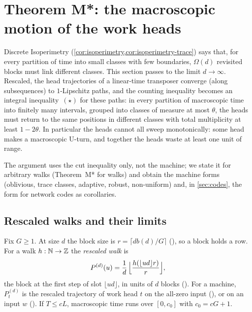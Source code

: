 \section{Theorem M*: the macroscopic motion of the work heads}\label{sec:mstar}

Discrete Isoperimetry (\cref{cor:isoperimetry,cor:isoperimetry-trace}) says that, for every
partition of time into small classes with few boundaries, $\Omega(d)$ revisited blocks must link
different classes. This section passes to the limit $d\to\infty$. Rescaled, the head trajectories of
a linear-time transposer converge (along subsequences) to $1$-Lipschitz paths, and the counting
inequality becomes an integral inequality~$(\star)$ for these paths: in every partition of macroscopic time into finitely many intervals, grouped into classes of measure at most $\theta$, the heads must return to the same
positions in different classes with total multiplicity at least $1-2\theta$. In particular the
heads cannot all sweep monotonically: some head makes a macroscopic U-turn, and together the heads
waste at least one unit of range.

The argument uses the cut inequality only, not the machine; we state it for arbitrary walks
(Theorem~M* for walks) and obtain the machine forms (oblivious, trace classes, adaptive, robust,
non-uniform) and, in \cref{sec:codes}, the form for network codes as corollaries.

\subsection{Rescaled walks and their limits}

Fix $G\ge1$. At size $d$ the block size is $r=\lceil db(d)/G\rceil$ (), so a
block holds a row. For a walk $h:\mathbb{N}\to\mathbb{Z}$ the \emph{rescaled walk} is
\[
  P^{(d)}(u)=\frac{1}{d}\,\Bigl\lfloor \frac{h(\lfloor ud\rfloor r)}{r}\Bigr\rfloor ,
\]
the block at the first step of slot $\lfloor ud\rfloor$, in units of $d$ blocks
(). For a machine, $P^{(d)}_t$ is the rescaled trajectory of work head $t$ on the
all-zero input (), or on an input $w$ (). If $T\le cL$,
macroscopic time runs over $[0,c_0]$ with $c_0=cG+1$.

